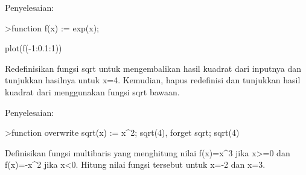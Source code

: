 \documentclass{article}
\begin{document}
\begin{eulernotebook}
\begin{eulercomment}
\begin{eulercomment}
\begin{eulercomment}
\begin{eulercomment}
\begin{eulercomment}
Penyelesaian:
\end{eulercomment}
\begin{eulerprompt}
>function f(x) := exp(x);
\end{eulerprompt}
\begin{euleroutput}
  plot(f(-1:0.1:1))
\end{euleroutput}
\begin{eulercomment}
Redefinisikan fungsi sqrt untuk mengembalikan hasil kuadrat dari
inputnya dan tunjukkan hasilnya untuk x=4. Kemudian, hapus redefinisi
dan tunjukkan hasil kuadrat dari menggunakan fungsi sqrt bawaan.


Penyelesaian:
\end{eulercomment}
\begin{eulerprompt}
>function overwrite sqrt(x) := x^2; sqrt(4), forget sqrt; sqrt(4)
\end{eulerprompt}
\begin{eulercomment}
Definisikan fungsi multibaris yang menghitung nilai f(x)=x\textasciicircum{}3 jika x\textgreater{}=0
dan f(x)=-x\textasciicircum{}2 jika x\textless{}0. Hitung nilai fungsi tersebut untuk x=-2 dan
x=3.



\end{eulercomment}
\end{eulercomment}
\end{eulercomment}
\end{eulercomment}
\end{eulercomment}
\end{eulernotebook}
\end{document}
